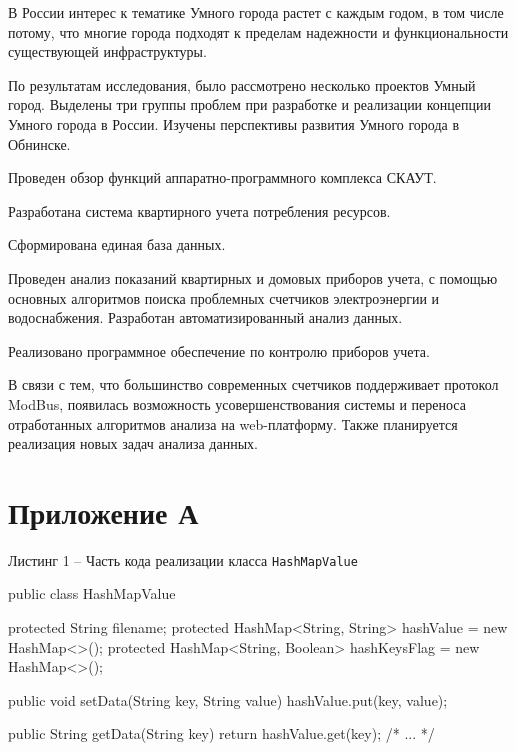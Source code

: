 \documentclass[a4paper,12pt]{article}
\begin{document}
В России интерес к тематике Умного города растет с каждым годом, в том числе потому, что многие города подходят к пределам надежности и функциональности существующей инфраструктуры.

По результатам исследования, было рассмотрено несколько проектов Умный город. Выделены три группы проблем при разработке и реализации концепции Умного города в России. Изучены перспективы развития Умного города в Обнинске.

Проведен обзор функций аппаратно-программного комплекса СКАУТ.

Разработана система квартирного учета потребления ресурсов. 

Сформирована единая база данных. 

Проведен анализ показаний квартирных и домовых приборов учета, с помощью основных алгоритмов поиска проблемных счетчиков электроэнергии и водоснабжения. Разработан автоматизированный анализ данных.

Реализовано программное обеспечение по контролю приборов учета.

В связи с тем, что большинство современных счетчиков поддерживает протокол ModBus, появилась возможность усовершенствования системы и переноса отработанных алгоритмов анализа на web-платформу. Также планируется реализация новых задач анализа данных.

\pagebreak

\printbibliography

\pagebreak

\section*{ \centering Приложение А} 

\begin{center}
Листинг 1 -- Часть кода реализации класса \verb|HashMapValue|
\end{center}


\begin{MyCode}

public class HashMapValue {
	
	protected String filename; 
	protected HashMap<String, String> hashValue = 
	new HashMap<>();
	protected HashMap<String, Boolean> hashKeysFlag =
	 new HashMap<>();
	
	public void setData(String key, String value) {
		hashValue.put(key, value);
	}
	
	public String getData(String key) {
		return hashValue.get(key);
	}
    /* ... */
}
\end{MyCode}
\end{document}
